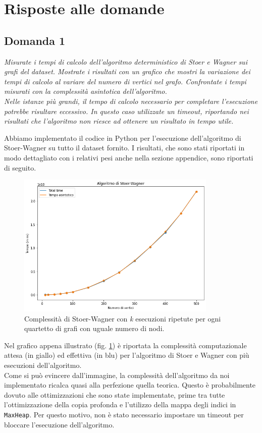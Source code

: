 \section{Risposte alle domande}

\subsection{Domanda 1}
\textit{Misurate i tempi di calcolo dell'algoritmo deterministico di Stoer e Wagner sui grafi del dataset. Mostrate i risultati con un grafico che mostri la variazione dei tempi di calcolo al variare del numero di vertici nel grafo. Confrontate i tempi misurati con la complessità asintotica dell'algoritmo. \\
Nelle istanze più grandi, il tempo di calcolo necessario per completare l'esecuzione potrebbe risultare eccessivo. In questo caso utilizzate un timeout, riportando nei risultati che l'algoritmo non riesce ad ottenere un risultato in tempo utile.}

Abbiamo implementato il codice in Python per l'esecuzione dell'algoritmo di Stoer-Wagner su tutto il dataset fornito. I risultati, che sono stati riportati in modo dettagliato con i relativi pesi anche nella sezione appendice, sono riportati di seguito.

\begin{figure}[H]
	\centering
	\includegraphics[width=0.85\textwidth]{res/images/single/stoerwagner}
	\caption{Complessità di Stoer-Wagner con \textit{k} esecuzioni ripetute per ogni quartetto di grafi con uguale numero di nodi.}
	\label{fig:stoerwagner}
\end{figure}

Nel grafico appena illustrato (fig. \ref{fig:stoerwagner}) è riportata la complessità computazionale attesa (in giallo) ed effettiva (in blu) per l'algoritmo di Stoer e Wagner con più esecuzioni dell'algoritmo. \\
Come si può evincere dall'immagine, la complessità dell'algoritmo da noi implementato ricalca quasi alla perfezione quella teorica. Questo è probabilmente dovuto alle ottimizzazioni che sono state implementate, prime tra tutte l'ottimizzazione della copia profonda e l'utilizzo della mappa degli indici in \texttt{MaxHeap}. Per questo motivo, non è stato necessario impostare un timeout per bloccare l'esecuzione dell'algoritmo. %


